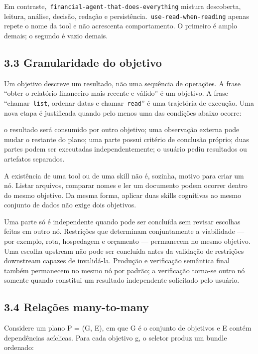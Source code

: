 \documentclass[12pt,a4paper]{article}
\begin{document}
Em contraste,\texttt{ financial-agent-that-does-everything} mistura descoberta, leitura, análise, decisão, redação e persistência.\texttt{ use-read-when-reading} apenas repete o nome da tool e não acrescenta comportamento. O primeiro é amplo demais; o segundo é vazio demais.


\subsection*{3.3 Granularidade do objetivo}

Um objetivo descreve um resultado, não uma sequência de operações. A frase “obter o relatório financeiro mais recente e válido” é um objetivo. A frase “chamar\texttt{ list}, ordenar datas e chamar\texttt{ read}” é uma trajetória de execução. Uma nova etapa é justificada quando pelo menos uma das condições abaixo ocorre:


\noindent \textbullet{} o resultado será consumido por outro objetivo; \textbullet{} uma observação externa pode mudar o restante do plano; \textbullet{} uma parte possui critério de conclusão próprio; \textbullet{} duas partes podem ser executadas independentemente; \textbullet{} o usuário pediu resultados ou artefatos separados.\par

A existência de uma tool ou de uma skill não é, sozinha, motivo para criar um nó. Listar arquivos, comparar nomes e ler um documento podem ocorrer dentro do mesmo objetivo. Da mesma forma, aplicar duas skills cognitivas ao mesmo conjunto de dados não exige dois objetivos.

Uma parte só é independente quando pode ser concluída sem revisar escolhas feitas em outro nó. Restrições que determinam conjuntamente a viabilidade --- por exemplo, rota, hospedagem e orçamento --- permanecem no mesmo objetivo. Uma escolha upstream não pode ser concluída antes da validação de restrições downstream capazes de invalidá-la. Produção e verificação semântica final também permanecem no mesmo nó por padrão; a verificação torna-se outro nó somente quando constitui um resultado independente solicitado pelo usuário.



\subsection*{3.4 Relações many-to-many}

Considere um plano P = (G, E), em que G é o conjunto de objetivos e E contém dependências acíclicas. Para cada objetivo g, o seletor produz um bundle ordenado:
\end{document}
